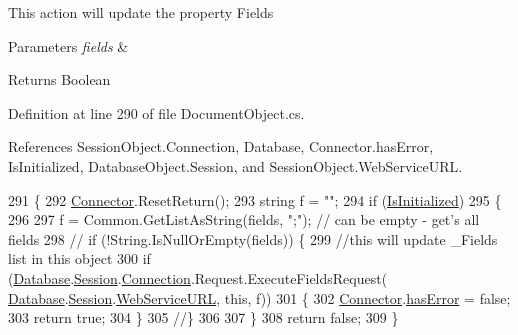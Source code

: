 This action will update the property \textquotesingle{}Fields\textquotesingle{}


\begin{DoxyParams}{Parameters}
{\em fields} & \\
\hline
\end{DoxyParams}
\begin{DoxyReturn}{Returns}
Boolean
\end{DoxyReturn}


Definition at line 290 of file Document\+Object.\+cs.



References Session\+Object.\+Connection, Database, Connector.\+has\+Error, Is\+Initialized, Database\+Object.\+Session, and Session\+Object.\+Web\+Service\+U\+RL.


\begin{DoxyCode}
291     \{
292         \mbox{\hyperlink{class_connector}{Connector}}.ResetReturn();
293         \textcolor{keywordtype}{string} f = \textcolor{stringliteral}{""};
294         \textcolor{keywordflow}{if} (\mbox{\hyperlink{class_document_object_a3b2075b73f38d05091b69decc6ce7992}{IsInitialized}})
295         \{
296 
297             f = Common.GetListAsString(fields, \textcolor{stringliteral}{";"}); \textcolor{comment}{// can be empty - get's all fields}
298             \textcolor{comment}{// if (!String.IsNullOrEmpty(fields)) \{}
299             \textcolor{comment}{//this will update \_Fields list in this object}
300             \textcolor{keywordflow}{if} (\mbox{\hyperlink{class_document_object_a69d5338c9835f748490323d2950eed09}{Database}}.\mbox{\hyperlink{class_database_object_aa8484162b7d2a7c4c9426bca13c64c07}{Session}}.\mbox{\hyperlink{class_session_object_a014bdbf705a753540e19bfb53030c55c}{Connection}}.Request.ExecuteFieldsRequest(
      \mbox{\hyperlink{class_document_object_a69d5338c9835f748490323d2950eed09}{Database}}.\mbox{\hyperlink{class_database_object_aa8484162b7d2a7c4c9426bca13c64c07}{Session}}.\mbox{\hyperlink{class_session_object_a697c071c812fbf7ad1166b896fb44c16}{WebServiceURL}}, \textcolor{keyword}{this}, f))
301             \{
302                 \mbox{\hyperlink{class_connector}{Connector}}.\mbox{\hyperlink{class_connector_a079bae21a5417efa53bfe8954c0f533f}{hasError}} = \textcolor{keyword}{false};
303                 \textcolor{keywordflow}{return} \textcolor{keyword}{true};
304             \}
305             \textcolor{comment}{//\}}
306 
307         \}
308         \textcolor{keywordflow}{return} \textcolor{keyword}{false};
309     \}
\end{DoxyCode}
\mbox{\label{class_document_object_a2c8aee9450e8fdd1e84e8ff26d0950a1}} 
